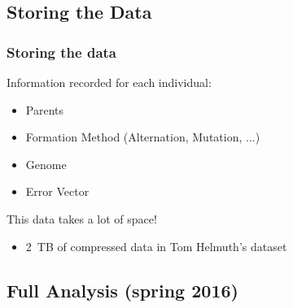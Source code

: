 \documentclass{beamer}
\begin{document}
   \subsection{Storing the Data}
   \begin{frame}
     \frametitle{Storing the data}
   Information recorded for each individual:
   \begin{itemize}
   \item Parents
   \item Formation Method (Alternation, Mutation, ...)
   \item Genome
   \item Error Vector
   \end{itemize}
   This data takes a lot of space! 
   \begin{itemize}
   \item 2~TB of compressed data in Tom Helmuth's dataset
   \end{itemize}
   \end{frame}
   \subsection{Full Analysis (spring 2016)}
\end{document}
